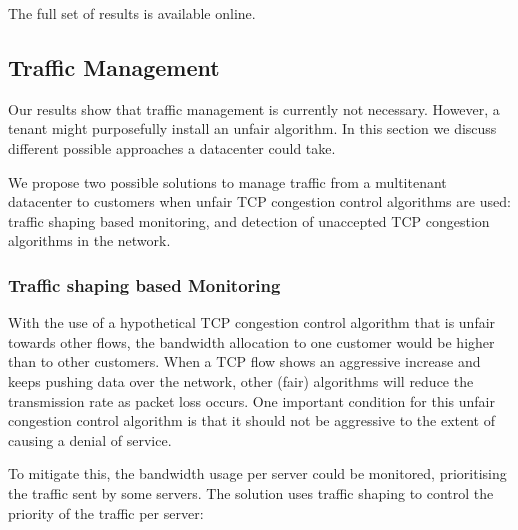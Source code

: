 \documentclass{article}
\begin{document}
The full set of results is available online\cite{git-lsproj}.


\subsection{Traffic Management}

Our results show that traffic management is currently not necessary. However, a
tenant might purposefully install an unfair algorithm. In this section we
discuss different possible approaches a datacenter could take.

We propose two possible solutions to manage traffic from a multitenant
datacenter to customers when unfair TCP congestion control algorithms are used:
traffic shaping based monitoring, and detection of unaccepted TCP congestion
algorithms in the network. 

\subsubsection{Traffic shaping based Monitoring}

With the use of a hypothetical TCP congestion control algorithm that is unfair towards other flows, the bandwidth allocation to one customer would be higher than to other customers. When a TCP flow shows an aggressive increase and keeps pushing data over the network, other (fair) algorithms will reduce the transmission rate as packet loss occurs. One important condition for this unfair congestion control algorithm is that it should not be aggressive to the extent of causing a denial of service.

To mitigate this, the bandwidth usage per server could be monitored, prioritising the traffic sent by some servers. The solution uses traffic shaping to control the priority of the traffic per server:
\end{document}
